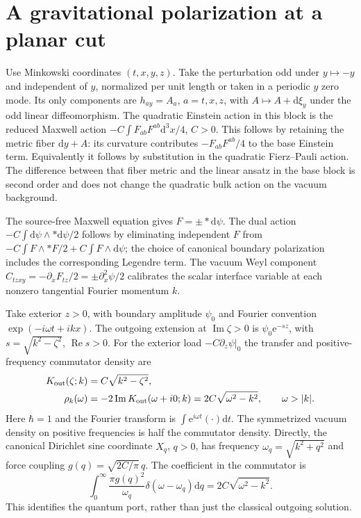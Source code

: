 \documentclass[11pt]{article}
\newcommand{\dd}{\mathrm d}
\newcommand{\e}{\mathrm e}
\begin{document}
\section{A gravitational polarization at a planar cut}
Use Minkowski coordinates \((t,x,y,z)\). Take the perturbation odd under \(y\mapsto-y\) and independent of \(y\), normalized per unit length or taken in a periodic \(y\) zero mode. Its only components are \(h_{ay}=A_a\), \(a=t,x,z\), with \(A\mapsto A+\dd\xi_y\) under the odd linear diffeomorphism. The quadratic Einstein action in this block is the reduced Maxwell action \(-C\int F_{ab}F^{ab}\dd^3x/4\), \(C>0\). This follows by retaining the metric fiber \(\dd y+A\): its curvature contributes \(-F_{ab}F^{ab}/4\) to the base Einstein term. Equivalently it follows by substitution in the quadratic Fierz--Pauli action. The difference between that fiber metric and the linear ansatz in the base block is second order and does not change the quadratic bulk action on the vacuum background.

The source-free Maxwell equation gives \(F=\pm *\dd\psi\). The dual action \(-C\int\dd\psi\wedge *\dd\psi/2\) follows by eliminating independent \(F\) from \(-C\int F\wedge *F/2+C\int F\wedge\dd\psi\); the choice of canonical boundary polarization includes the corresponding Legendre term. The vacuum Weyl component \(C_{tzxy}=-\partial_x F_{tz}/2=\pm\partial_x^2\psi/2\) calibrates the scalar interface variable at each nonzero tangential Fourier momentum \(k\).

Take exterior \(z>0\), with boundary amplitude \(\psi_0\) and Fourier convention \(\exp(-i\omega t+ikx)\). The outgoing extension at \(\operatorname{Im}\zeta>0\) is \(\psi_0\e^{-s z}\), with \(s=\sqrt{k^2-\zeta^2}\), \(\operatorname{Re}s>0\). For the exterior load \(-C\partial_z\psi|_0\) the transfer and positive-frequency commutator density are
\begin{align}
 K_{\rm out}(\zeta;k)&=C\sqrt{k^2-\zeta^2},\\
 \rho_k(\omega)&=-2\operatorname{Im}K_{\rm out}(\omega+i0;k)
 =2C\sqrt{\omega^2-k^2},\qquad\omega>|k|.\label{eq:flat-rho}
\end{align}
Here \(\hbar=1\) and the Fourier transform is \(\int\e^{i\omega t}(\cdot)\dd t\). The symmetrized vacuum density on positive frequencies is half the commutator density. Directly, the canonical Dirichlet sine coordinate \(X_q\), \(q>0\), has frequency \(\omega_q=\sqrt{k^2+q^2}\) and force coupling \(g(q)=\sqrt{2C/\pi}\,q\). The coefficient in the commutator is
\[
 \int_0^\infty\frac{\pi g(q)^2}{\omega_q}\delta(\omega-\omega_q)\dd q
 =2C\sqrt{\omega^2-k^2}.
\]
This identifies the quantum port, rather than just the classical outgoing solution.
\end{document}
